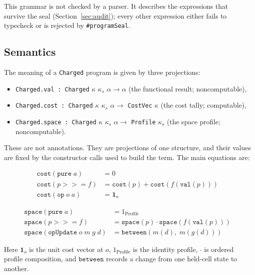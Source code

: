 \documentclass[acmsmall,nonacm]{acmart}
\begin{document}
This grammar is not checked by a parser.
It describes the expressions that survive the seal (Section~\ref{sec:audit}); every other expression either fails to typecheck or is rejected by \lstinline{#programSeal}.

\subsection{Semantics}\label{sec:semantics}

The meaning of a \lstinline{Charged} program is given by three projections:

\begin{itemize}
  \item \lstinline{Charged.val : Charged} $\kappa$ $\kappa_s$ $\alpha \to \alpha$ (the functional result; noncomputable),
  \item \lstinline{Charged.cost : Charged} $\kappa$ $\kappa_s$ $\alpha \to$ \lstinline{CostVec} $\kappa$ (the cost tally; computable),
  \item \lstinline{Charged.space : Charged} $\kappa$ $\kappa_s$ $\alpha \to$ \lstinline{Profile} $\kappa_s$ (the space profile; noncomputable).
\end{itemize}

These are not annotations.
They are projections of one structure, and their values are fixed by the constructor calls used to build the term.
The main equations are:

\begin{align*}
\texttt{cost}(\texttt{pure}\; a) &= 0 \\
\texttt{cost}(p \mathbin{>\!\!>\!\!=} f) &= \texttt{cost}(p) + \texttt{cost}(f(\texttt{val}(p))) \\
\texttt{cost}(\texttt{op}\; o\; a) &= \mathbf{1}_o
\end{align*}

\begin{align*}
\texttt{space}(\texttt{pure}\; a) &= 1_{\text{Profile}} \\
\texttt{space}(p \mathbin{>\!\!>\!\!=} f) &= \texttt{space}(p) \cdot \texttt{space}(f(\texttt{val}(p))) \\
\texttt{space}(\texttt{opUpdate}\; o\; m\; g\; d) &= \texttt{between}(m(d),\; m(g(d)))
\end{align*}

Here $\mathbf{1}_o$ is the unit cost vector at $o$, $1_{\text{Profile}}$ is the identity profile, $\cdot$ is ordered profile composition, and $\texttt{between}$ records a change from one held-cell state to another.
\end{document}

